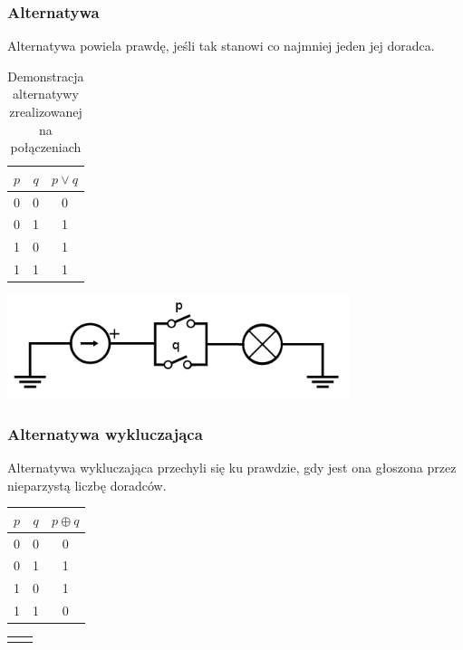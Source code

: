 \documentclass[a4paper,12pt]{article}
\begin{document}
\subsubsection{Alternatywa}
Alternatywa powiela prawdę, jeśli tak stanowi co najmniej jeden jej doradca.

\begin{table}[h!]
\centering

\begin{minipage}{5.5cm}
\centering

\begin{tabular}{ | c | c || c | }
  \hline
  $p$ & $q$ & $p \lor q$ \\ \hline
  0 & 0 & 0 \\
  0 & 1 & 1 \\
  1 & 0 & 1 \\
  1 & 1 & 1 \\
  \hline
\end{tabular}
\end{minipage}
\begin{minipage}{11cm}
   \includegraphics[width=10cm]{grafika/obwody/circuit-or.png}
   \caption*{Demonstracja alternatywy zrealizowanej na połączeniach}
\end{minipage}
\end{table}

\newpage

\subsubsection{Alternatywa wykluczająca}
Alternatywa wykluczająca przechyli się ku prawdzie, gdy jest ona głoszona przez nieparzystą liczbę doradców.

\begin{table}[h!]
\centering

\begin{minipage}{5.5cm}
\centering

\begin{tabular}{ | c | c || c | }
  \hline
  $p$ & $q$ & $p \oplus q$ \\ \hline
  0 & 0 & 0 \\
  0 & 1 & 1 \\
  1 & 0 & 1 \\
  1 & 1 & 0 \\
  \hline
\end{tabular}
\end{minipage}
\begin{minipage}{11cm}
\begin{tabular}{  c r }
  & \\
\end{tabular}
\end{minipage}
\end{table}
\end{document}
